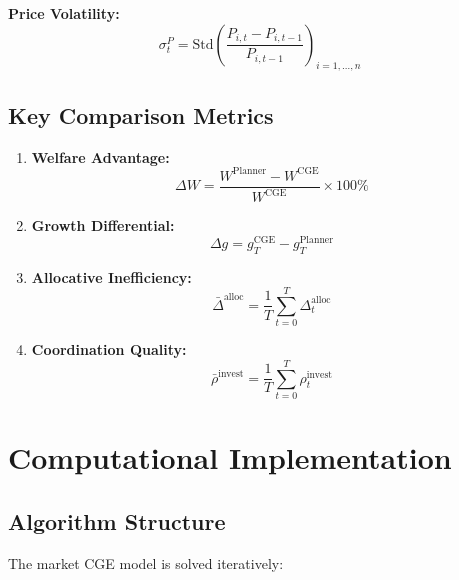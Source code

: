 \documentclass[12pt,a4paper]{article}
\theoremstyle{definition}
\theoremstyle{remark}
\begin{document}
\textbf{Price Volatility:}
\begin{equation}
    \sigma_t^P = \text{Std}\left(\frac{P_{i,t} - P_{i,t-1}}{P_{i,t-1}}\right)_{i=1,\ldots,n}
\end{equation}

\subsection{Key Comparison Metrics}

\begin{enumerate}
    \item \textbf{Welfare Advantage:}
    \begin{equation}
        \Delta W = \frac{W^{\text{Planner}} - W^{\text{CGE}}}{W^{\text{CGE}}} \times 100\%
    \end{equation}
    
    \item \textbf{Growth Differential:}
    \begin{equation}
        \Delta g = g_T^{\text{CGE}} - g_T^{\text{Planner}}
    \end{equation}
    
    \item \textbf{Allocative Inefficiency:}
    \begin{equation}
        \bar{\Delta}^{\text{alloc}} = \frac{1}{T} \sum_{t=0}^T \Delta_t^{\text{alloc}}
    \end{equation}
    
    \item \textbf{Coordination Quality:}
    \begin{equation}
        \bar{\rho}^{\text{invest}} = \frac{1}{T} \sum_{t=0}^T \rho_t^{\text{invest}}
    \end{equation}
\end{enumerate}

\section{Computational Implementation}

\subsection{Algorithm Structure}

The market CGE model is solved iteratively:
\end{document}
